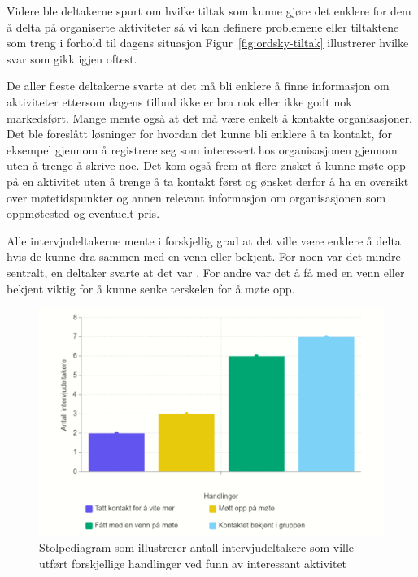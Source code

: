 Videre ble deltakerne spurt om hvilke tiltak som kunne gjøre det enklere for dem å delta på organiserte aktiviteter så vi kan definere problemene eller tiltaktene som treng i forhold til dagens situasjon Figur~\ref{fig:ordsky-tiltak} illustrerer hvilke svar som gikk igjen oftest.

De aller fleste deltakerne svarte at det må bli enklere å finne informasjon om aktiviteter ettersom dagens tilbud ikke er bra nok eller ikke godt nok markedsført. Mange mente også at det må være enkelt å kontakte organisasjoner. Det ble foreslått løsninger for hvordan det kunne bli enklere å ta kontakt, for eksempel gjennom å registrere seg som interessert hos organisasjonen gjennom uten å trenge å skrive noe. Det kom også frem at flere ønsket å kunne møte opp på en aktivitet uten å trenge å ta kontakt først og ønsket derfor å ha en oversikt over møtetidspunkter og annen relevant informasjon om organisasjonen som oppmøtested og eventuelt pris.

Alle intervjudeltakerne mente i forskjellig grad at det ville være enklere å delta hvis de kunne dra sammen med en venn eller bekjent. For noen var det mindre sentralt, en deltaker svarte at det var . For andre var det å få med en venn eller bekjent viktig for å kunne senke terskelen for å møte opp.

\begin{figure}[H]
\includegraphics[width=\textwidth]{Illustrasjoner/diagram-handlinger.png}
\caption{Stolpediagram som illustrerer antall intervjudeltakere som ville utført forskjellige handlinger ved funn av interessant aktivitet}
\label{fig:diagram-handlinger}
\end{figure}

